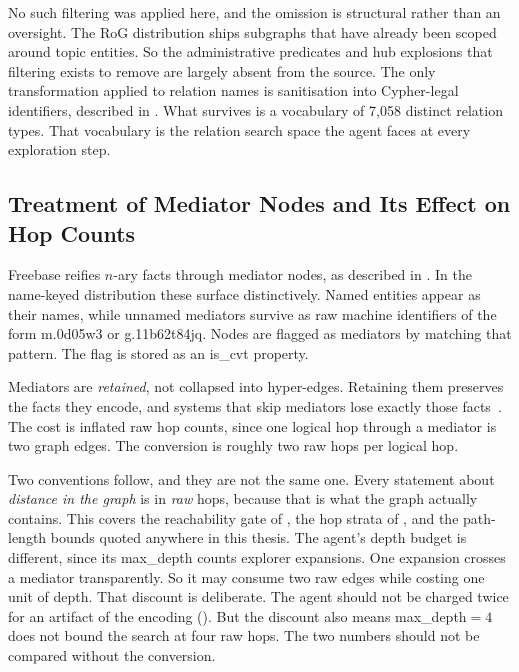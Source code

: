 No such filtering was applied here, and the omission is structural rather than
an oversight. The RoG distribution ships subgraphs that have already been scoped
around topic entities. So the administrative predicates and hub explosions that
filtering exists to remove are largely absent from the source. The only
transformation applied to relation names is sanitisation into Cypher-legal
identifiers, described in . What survives is a vocabulary
of 7{,}058 distinct relation types. That vocabulary is the relation search space
the agent faces at every exploration step.

\subsection{Treatment of Mediator Nodes and Its Effect on Hop Counts}

Freebase reifies $n$-ary facts through mediator nodes, as described
in . In the
name-keyed distribution these surface distinctively. Named entities appear as
their names, while unnamed mediators survive as raw machine identifiers of the
form \textsf{m.0d05w3} or \textsf{g.11b62t84jq}. Nodes are flagged as mediators
by matching that pattern. The flag is stored as an \textsf{is\_cvt} property.

Mediators are \emph{retained}, not collapsed into hyper-edges. Retaining them
preserves the facts they encode, and systems that skip mediators lose exactly
those facts~\cite{xu2024generate}. The cost is inflated raw hop counts, since
one logical hop through a mediator is two graph edges. The conversion is roughly
two raw hops per logical hop.

Two conventions follow, and they are not the same one. Every statement about
\emph{distance in the graph} is in \emph{raw} hops, because that is what the
graph actually contains. This covers the reachability gate of
, the hop strata of , and the
path-length bounds quoted anywhere in this thesis. The agent's depth budget is
different, since its \textsf{max\_depth} counts explorer expansions. One
expansion crosses a mediator transparently. So it may consume two raw edges
while costing one unit of depth. That discount is deliberate. The agent should
not be charged twice for an artifact of the encoding
(). But the discount also means
\textsf{max\_depth}${}=4$ does not bound the search at four raw hops. The two
numbers should not be compared without the conversion.

